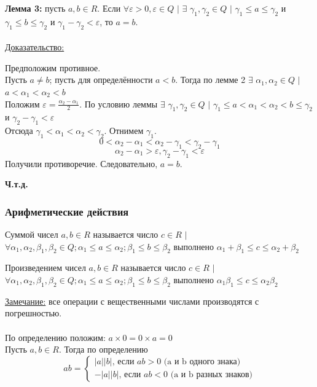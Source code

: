 \documentclass[12pt]{article}
\begin{document}
    \noindent \textbf{Лемма 3:} пусть $a,b \in R$. Если $\forall \varepsilon > 0, \varepsilon \in Q$ $|$ $\exists$ $\gamma_{1}, \gamma_{2} \in Q$ $|$ $\gamma_{1} \le a \le \gamma_{2}$ и $\gamma_{1} \le b \le \gamma_{2}$ и $\gamma_{1} - \gamma_{2} < \varepsilon$, то $a = b$.\\\\
    \underline{Доказательство:} 
    \begin{adjustwidth}{1.5em}{1.5em}
        Предположим противное.\\
        Пусть $a \ne b$; пусть для определённости $a < b$. Тогда по лемме 2 $\exists$ $\alpha_{1}, \alpha_{2} \in Q$ $|$ $a < \alpha_{1} < \alpha_{2} < b$\\
        Положим $\varepsilon = \frac{\alpha_{2}-\alpha_{1}}{2}$. По условию леммы $\exists$ $\gamma_{1}, \gamma_{2} \in Q$ $|$ $\gamma_{1} \le a < \alpha_{1} < \alpha_{2} < b \le \gamma_{2}$ и $\gamma_{2} - \gamma_{1} < \varepsilon$\\
        Отсюда $\gamma_{1} < \alpha_{1} < \alpha_{2} < \gamma_{2}$. Отнимем $\gamma_{1}$.\\
        \[0 < \alpha_{2} - \alpha_{1} < \alpha_{2}-\gamma_{1} < \gamma_{2}-\gamma_{1}\]
        \[\alpha_{2} - \alpha_{1} > \varepsilon, \gamma_{2} - \gamma_{1} < \varepsilon\]
        Получили противоречие. Следовательно, $a = b$.
        \begin{center}
            \textbf{Ч.т.д.}
        \end{center}
    \end{adjustwidth}

    \subsubsection*{Арифметические действия}
    \noindent Суммой чисел $a,b \in R$ называется число $c \in R$ $|$ $\forall \alpha_{1}, \alpha_{2}, \beta_{1}, \beta_{2} \in Q; \alpha_{1} \le a \le \alpha_{2}; \beta_{1} \le b \le \beta_{2}$ выполнено $\alpha_{1} + \beta_{1} \le c \le \alpha_{2} + \beta_{2}$\par\noindent
    \noindent Произведением чисел $a,b \in R$ называется число $c \in R$ $|$ $\forall \alpha_{1}, \alpha_{2}, \beta_{1}, \beta_{2} \in Q; \alpha_{1} \le a \le \alpha_{2}; \beta_{1} \le b \le \beta_{2}$ выполнено $\alpha_{1}\beta_{1}\le c \le \alpha_{2}\beta_{2}$\par\noindent
    \underline{Замечание:} все операции с вещественными числами производятся с погрешностью.\\\\
    По определению положим: $a \times 0 = 0 \times a = 0$\\
    Пусть $a,b \in R$. Тогда по определению
    \[ab = \begin{cases}
        |a||b|\text{, если }ab > 0\text{ (a и b одного знака)}\\
        -|a||b|\text{, если }ab < 0\text{ (a и b разных знаков)}
    \end{cases}\]
\end{document}
